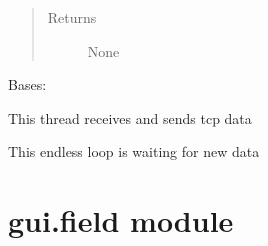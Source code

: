 \documentclass[letterpaper,10pt,english]{sphinxmanual}
\begin{document}
\begin{fulllineitems}
\begin{fulllineitems}
\begin{quote}
\begin{description}
\item[{Returns}] \leavevmode
None

\end{description}\end{quote}

\end{fulllineitems}


\end{fulllineitems}


\begin{fulllineitems}
\label{gui:gui.communication.TcpConnection}
Bases: 

This thread receives and sends tcp data

\begin{fulllineitems}
\label{gui:gui.communication.TcpConnection.run}
This endless loop is waiting for new data

\end{fulllineitems}


\end{fulllineitems}



\section{gui.field module}
\label{gui:gui-field-module}\label{gui:module-gui.field}
\end{document}
